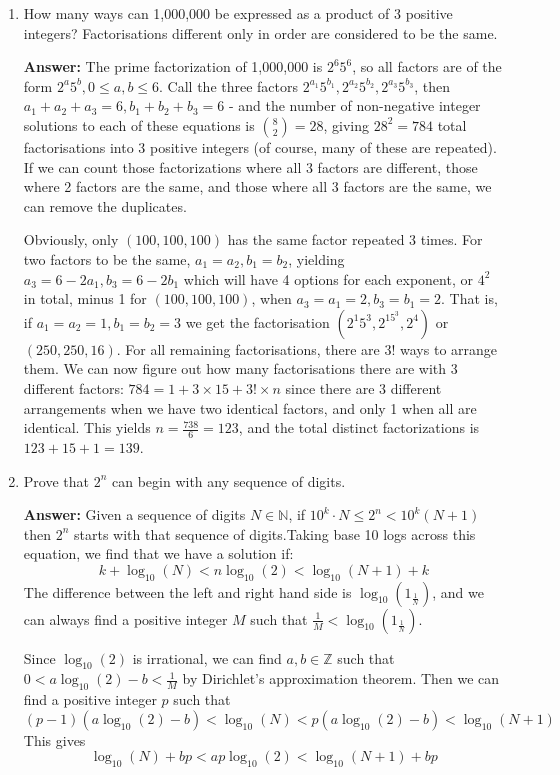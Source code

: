 \documentclass{article}
\begin{document}
\begin{enumerate}
    \item How many ways can 1,000,000 be expressed as a product of 3 positive integers? Factorisations different only in order are considered to be the same.
    
    \textbf{Answer:} The prime factorization of 1,000,000 is $2^6 5^6$, so all factors are of the form $2^a 5^b, 0\leq a,b \leq 6$. Call the three factors $2^{a_1}5^{b_1}, 2^{a_2}5^{b_2}, 2^{a_3}5^{b_3}$, then $a_1+a_2+a_3 = 6, b_1+b_2+b_3 = 6$ - and the number of non-negative integer solutions to each of these equations is $\binom{8}{2} = 28$, giving $28^2 = 784$ total factorisations into 3 positive integers (of course, many of these are repeated). If we can count those factorizations where all 3 factors are different, those where 2 factors are the same, and those where all 3 factors are the same, we can remove the duplicates.
    
    Obviously, only $(100,100,100)$ has the same factor repeated 3 times. For two factors to be the same, $a_1=a_2, b_1=b_2$, yielding $a_3=6-2a_1, b_3=6-2b_1$ which will have 4 options for each exponent, or $4^2$ in total, minus 1 for $(100,100,100)$, when $a_3=a_1=2, b_3=b_1=2$. That is, if $a_1=a_2=1, b_1=b_2=3$ we get the factorisation $(2^1 5^3,2^15^3,2^4)$ or $(250,250,16)$. For all remaining factorisations, there are $3!$ ways to arrange them. We can now figure out how many factorisations there are with 3 different factors: $784 = 1 + 3 \times 15 + 3! \times n$ since there are 3 different arrangements when we have two identical factors, and only 1 when all are identical. This yields $n = \frac{738}{6} = 123$, and the total distinct factorizations is $123 + 15 + 1 = 139$.

    \item Prove that $2^n$ can begin with any sequence of digits.
    
    \textbf{Answer:} Given a sequence of digits $N \in \mathbb{N}$, if $10^k\cdot N \leq 2^n < 10^k(N+1)$ then $2^n$ starts with that sequence of digits.Taking base 10 logs across this equation, we find that we have a solution if:
    \[k + \log_{10} (N) < n \log_{10}(2) < \log_{10}(N+1) + k\]
    The difference between the left and right hand side is $\log_{10}(1_\frac{1}{N})$, and we can always find a positive integer $M$ such that $\frac{1}{M} < \log_{10}(1_\frac{1}{N})$. 

    Since $\log_{10}(2)$ is irrational, we can find $a,b \in \mathbb{Z}$ such that $0 < a\log_{10}(2)-b < \frac{1}{M}$ by Dirichlet's approximation theorem. Then we can find a positive integer $p$ such that 
    \[ (p-1)(a\log_{10}(2) - b) < \log_{10}(N) < p (a\log_{10}(2) - b) < \log_{10}(N+1) \]
    This gives
    \[ \log_{10}(N) + bp < ap\log_{10}(2) < \log_{10}(N+1) + bp \]
    

\end{enumerate}
\end{document}
